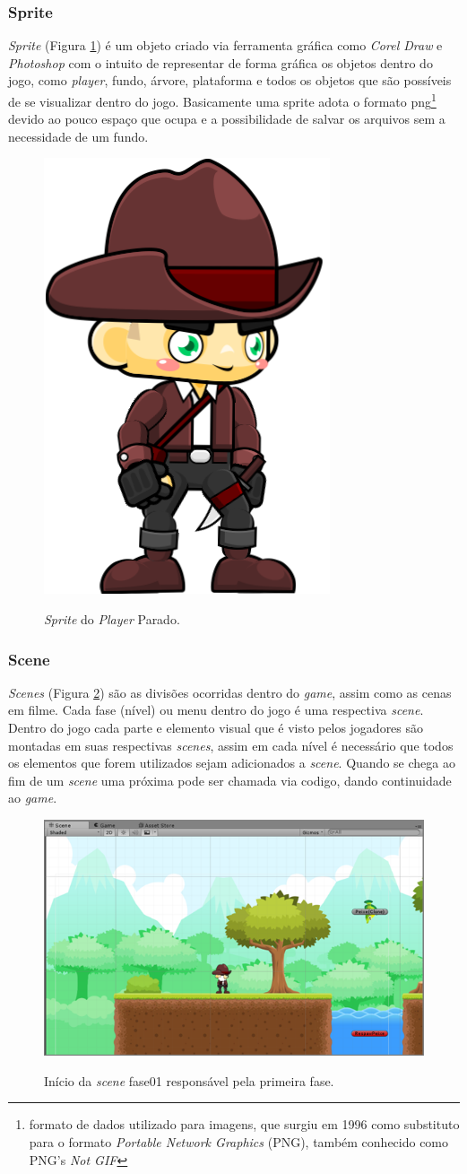 \documentclass[
	12pt,				%
    oneside,			%
	a4paper,			%
	english,			%
	french,				%
	spanish,			%
	brazil,				%
	]{abntex2}
\begin{document}
			\subsubsection{Sprite}
				\textit{Sprite} (Figura \ref{fig:07}) é um objeto criado via ferramenta gráfica como \textit{Corel Draw} e \textit{Photoshop} com o intuito de representar de forma gráfica os objetos dentro do jogo, como \textit{player}, fundo, árvore, plataforma e todos os objetos que são possíveis de se visualizar dentro do jogo. Basicamente uma sprite adota o formato png\footnote{ formato de dados utilizado para imagens, que surgiu em 1996 como substituto para o formato \textit{Portable Network Graphics} (PNG), também conhecido como PNG's \textit{Not GIF}} devido ao pouco espaço que ocupa e a possibilidade de salvar os arquivos sem a necessidade de um fundo.
				
				\begin{figure}[H]
					\caption{\textit{Sprite} do \textit{Player }Parado.}
					\centering
					\includegraphics[width=0.2\linewidth]{Imagens/07}
					\label{fig:07}
				\end{figure}
				
				
			\subsubsection{Scene}
				\textit{Scenes} (Figura \ref{fig:08}) são as divisões ocorridas dentro do \textit{game}, assim como as cenas em filme. Cada fase (nível) ou menu dentro do jogo é uma respectiva \textit{scene}. Dentro do jogo cada parte e elemento visual que é visto pelos jogadores são montadas em suas respectivas \textit{scenes}, assim em cada nível é necessário que todos os elementos que forem utilizados sejam adicionados a \textit{scene}. Quando se chega ao fim de um \textit{scene} uma próxima pode ser chamada via codigo, dando continuidade ao \textit{game}.
				\begin{figure}[H]
					\caption{Início da \textit{scene} fase01 responsável pela primeira fase.}
					\centering
					\includegraphics[width=0.7\linewidth]{Imagens/08}
					\label{fig:08}
				\end{figure}
				
\end{document}

